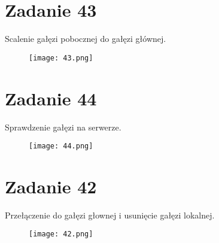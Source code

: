 \documentclass[fleqn,onecolumn,a4paper,12pt,titlepage]{article}
\begin{document}
\section*{Zadanie 43}
Scalenie gałęzi pobocznej do gałęzi głównej.
\begin{figure}[H]%
    \centering\texttt{[image: 43.png]}
\end{figure}

\section*{Zadanie 44}
Sprawdzenie gałęzi na serwerze.
\begin{figure}[H]%
    \centering\texttt{[image: 44.png]}
\end{figure}

\section*{Zadanie 42}
Przełączenie do gałęzi głownej i usunięcie gałęzi lokalnej.
\begin{figure}[H]%
    \centering\texttt{[image: 42.png]}
\end{figure}
\end{document}
